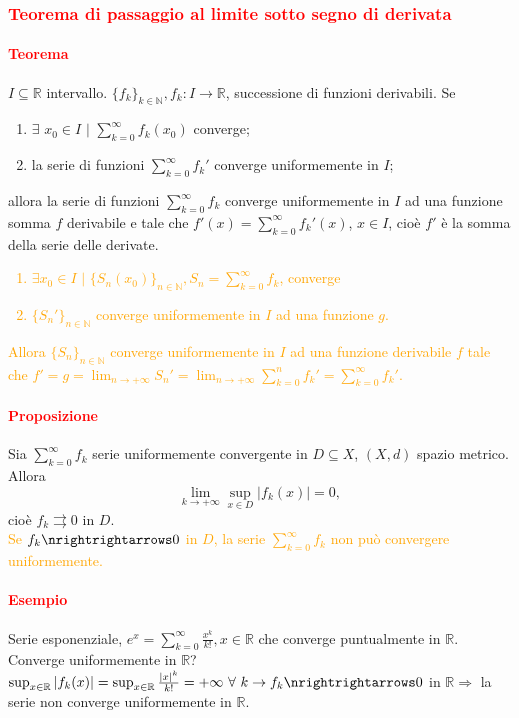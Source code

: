 \documentclass{article}
\newcommand{\R}{\mathbb{R}}
\newcommand{\N}{\mathbb{N}}
\begin{document}
\subsubsection{\textcolor{red}{Teorema di passaggio al limite sotto segno di derivata}}
\paragraph{\textcolor{red}{Teorema}}
$I \subseteq \R$ intervallo. $\{f_k\}_{k \in \N}, f_k: I \rightarrow \R$, successione di funzioni derivabili. Se 
\begin{enumerate}
    \item $\exists\,\, x_0\in I \,\, |\,\, \sum_{k=0}^{\infty}f_k(x_0)$ converge;
    \item la serie di funzioni $\sum_{k=0}^{\infty}f_k'$ converge uniformemente in $I$;
\end{enumerate}
allora la serie di funzioni $\sum_{k=0}^{\infty}f_k$ converge uniformemente in $I$ ad una funzione somma $f$ derivabile e tale che $f'(x)= \sum_{k=0}^{\infty}f_k'(x)$, $x \in I$, cioè $f'$ è la somma della serie delle derivate.
\textcolor{orange}{
\begin{enumerate}
    \item $\exists x_0 \in I \,\, |\,\, \{S_n(x_0)\}_{n \in \N}, S_n= \sum_{k=0}^{\infty}f_k$, converge
    \item $\{S_n'\}_{n \in \N}$ converge uniformemente in $I$ ad una funzione $g$.
\end{enumerate}
Allora $\{S_n\}_{n \in \N}$ converge uniformemente in $I$ ad una funzione derivabile $f$ tale che $f'=g=\lim_{n\rightarrow +\infty} S_n' =\lim_{n\rightarrow +\infty} \sum_{k=0}^{n} f_k'=\sum_{k=0}^{\infty}f_k'$.
}

\paragraph{\textcolor{red}{Proposizione}}
Sia $\sum_{k=0}^{\infty} f_k$ serie uniformemente convergente in $D \subseteq X$, $(X,d)$ spazio metrico. Allora 
\begin{equation*}
    \lim_{k\rightarrow+\infty}\sup_{x \in D} |f_k(x)|=0,
\end{equation*}
cioè $f_k \rightrightarrows 0$ in $D$.\\
\textcolor{orange}{Se $f_k \nrightrightarrows 0$ in $D$, la serie $\sum_{k=0}^{\infty}f_k$ non può convergere uniformemente.}
\paragraph{\textcolor{red}{Esempio}}
Serie esponenziale, $e^x= \sum_{k=0}^{\infty}\frac{x^k}{k!}, x \in \R$ che converge puntualmente in $\R$. Converge uniformemente in $\R$?\\
$\sup_{x \in \R}|f_k(x)|=\sup_{x \in \R}\frac{|x|^k}{k!}=+\infty \,\,\forall\,\,  k \rightarrow f_k \nrightrightarrows 0$ in $\R \Rightarrow$ la serie non converge uniformemente in $\R$.
\end{document}
